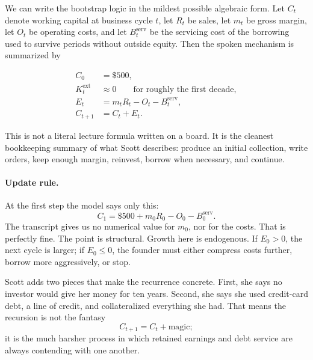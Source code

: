 We can write the bootstrap logic in the mildest possible algebraic form. Let \(C_t\) denote working capital at business cycle \(t\), let \(R_t\) be sales, let \(m_t\) be gross margin, let \(O_t\) be operating costs, and let \(B_t^{\text{serv}}\) be the servicing cost of the borrowing used to survive periods without outside equity. Then the spoken mechanism is summarized by

\begin{align}
C_0 &= \$500,\\
K_t^{\text{ext}} &\approx 0 \qquad \text{for roughly the first decade},\\
E_t &= m_t R_t - O_t - B_t^{\text{serv}},\\
C_{t+1} &= C_t + E_t.
\end{align}

This is not a literal lecture formula written on a board. It is the cleanest bookkeeping summary of what Scott describes: produce an initial collection, write orders, keep enough margin, reinvest, borrow when necessary, and continue.

\paragraph{Update rule.} At the first step the model says only this:
\begin{equation}
C_1 = \$500 + m_0 R_0 - O_0 - B_0^{\text{serv}}.
\end{equation}
The transcript gives us no numerical value for \(m_0\), nor for the costs. That is perfectly fine. The point is structural. Growth here is endogenous. If \(E_0>0\), the next cycle is larger; if \(E_0\leq 0\), the founder must either compress costs further, borrow more aggressively, or stop.

Scott adds two pieces that make the recurrence concrete. First, she says no investor would give her money for ten years. Second, she says she used credit-card debt, a line of credit, and collateralized everything she had. That means the recursion is not the fantasy
\[
C_{t+1}=C_t+\text{magic};
\]
it is the much harsher process in which retained earnings and debt service are always contending with one another.

